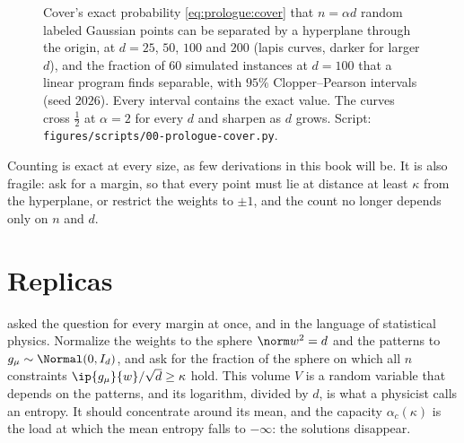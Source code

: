 \begin{refsection}
\begin{figure}[t]
\centering
{}
\caption{Cover's exact probability \eqref{eq:prologue:cover} that $n=\alpha d$ random labeled Gaussian points can be separated by a hyperplane through the origin, at $d=25$, $50$, $100$ and $200$ (lapis curves, darker for larger $d$), and the fraction of $60$ simulated instances at $d=100$ that a linear program finds separable, with $95\%$ Clopper--Pearson intervals (seed $2026$). Every interval contains the exact value. The curves cross $\frac12$ at $\alpha=2$ for every $d$ and sharpen as $d$ grows. Script: \texttt{figures/scripts/00-prologue-cover.py}.}\label{fig:prologue:cover}
\end{figure}

Counting is exact at every size, as few derivations in this book will be. It is also fragile: ask for a margin, so that every point must lie at distance at least $\kappa$ from the hyperplane, or restrict the weights to $\pm1$, and the count no longer depends only on $n$ and $d$.

\section*{Replicas}

\textcite{Gardner1988} asked the question for every margin at once, and in the language of statistical physics. Normalize the weights to the sphere $\norm w^2=d$ and the patterns to $g_\mu\sim\Normal(0,I_d)$, and ask for the fraction of the sphere on which all $n$ constraints $\ip{g_\mu}{w}/\sqrt d\ge\kappa$ hold. This volume $V$ is a random variable that depends on the patterns, and its logarithm, divided by $d$, is what a physicist calls an entropy. It should concentrate around its mean, and the capacity $\alpha_c(\kappa)$ is the load at which the mean entropy falls to $-\infty$: the solutions disappear.


\end{refsection}
